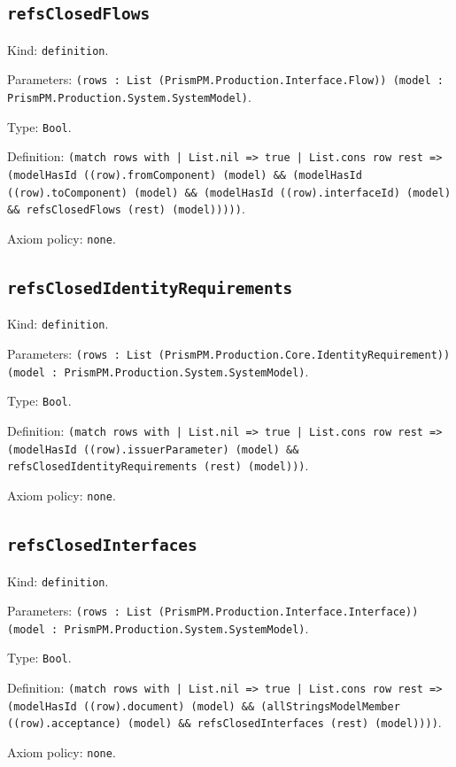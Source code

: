 \documentclass[11pt]{article}
\begin{document}
\subsection*{\texttt{refsClosedFlows}}
\noindent Kind: \texttt{definition}.\par
\noindent Parameters: \texttt{(rows : List (PrismPM.Production.Interface.Flow)) (model : PrismPM.Production.System.SystemModel)}.\par
\noindent Type: \texttt{Bool}.\par
\noindent Definition: \texttt{(match rows with | List.nil => true | List.cons row rest => (modelHasId ((row).fromComponent) (model) \&\& (modelHasId ((row).toComponent) (model) \&\& (modelHasId ((row).interfaceId) (model) \&\& refsClosedFlows (rest) (model)))))}.\par
\noindent Axiom policy: \texttt{none}.\par
\subsection*{\texttt{refsClosedIdentityRequirements}}
\noindent Kind: \texttt{definition}.\par
\noindent Parameters: \texttt{(rows : List (PrismPM.Production.Core.IdentityRequirement)) (model : PrismPM.Production.System.SystemModel)}.\par
\noindent Type: \texttt{Bool}.\par
\noindent Definition: \texttt{(match rows with | List.nil => true | List.cons row rest => (modelHasId ((row).issuerParameter) (model) \&\& refsClosedIdentityRequirements (rest) (model)))}.\par
\noindent Axiom policy: \texttt{none}.\par
\subsection*{\texttt{refsClosedInterfaces}}
\noindent Kind: \texttt{definition}.\par
\noindent Parameters: \texttt{(rows : List (PrismPM.Production.Interface.Interface)) (model : PrismPM.Production.System.SystemModel)}.\par
\noindent Type: \texttt{Bool}.\par
\noindent Definition: \texttt{(match rows with | List.nil => true | List.cons row rest => (modelHasId ((row).document) (model) \&\& (allStringsModelMember ((row).acceptance) (model) \&\& refsClosedInterfaces (rest) (model))))}.\par
\noindent Axiom policy: \texttt{none}.\par
\end{document}
